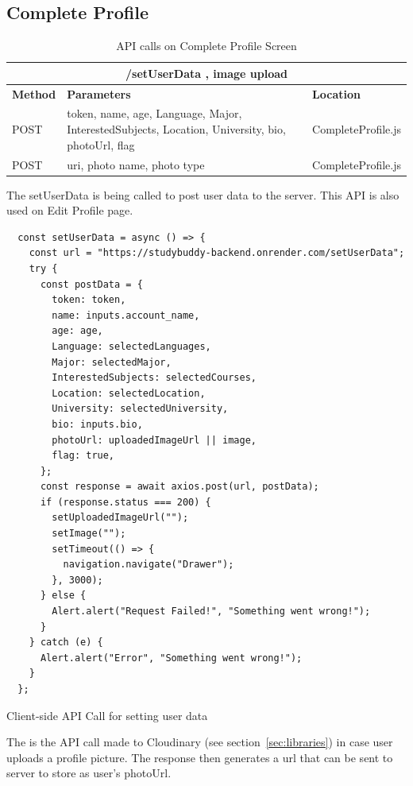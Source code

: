 \subsection{Complete Profile}\label{subsec:complete_profile}
\begin{table}[H]
	\centering
	\begin{tabular}{ |p{}|p{}|p{}| }
		\hline
            \multicolumn{3}{|c|}{/setUserData , image upload} \\
            \hline
		\textbf{Method} & \textbf{Parameters} & \textbf{Location}\\
            \hline
		  POST & token, name, age, Language, Major, InterestedSubjects, Location, University, bio, photoUrl, flag & CompleteProfile.js\\
            \hline
		  POST & uri, photo name, photo type & CompleteProfile.js\\
            \hline
	\end{tabular}
	\caption{API calls on Complete Profile Screen}
	\label{tab:complete_profile}
\end{table}
The setUserData is being called to post user data to the server. This API is also used on Edit Profile page.
\begin{listing}[H]
\begin{verbatim} 
  const setUserData = async () => {
    const url = "https://studybuddy-backend.onrender.com/setUserData";
    try {
      const postData = {
        token: token,
        name: inputs.account_name,
        age: age,
        Language: selectedLanguages,
        Major: selectedMajor,
        InterestedSubjects: selectedCourses,
        Location: selectedLocation,
        University: selectedUniversity,
        bio: inputs.bio,
        photoUrl: uploadedImageUrl || image,
        flag: true,
      };
      const response = await axios.post(url, postData);
      if (response.status === 200) {
        setUploadedImageUrl("");
        setImage("");
        setTimeout(() => {
          navigation.navigate("Drawer");
        }, 3000);
      } else {
        Alert.alert("Request Failed!", "Something went wrong!");
      }
    } catch (e) {
      Alert.alert("Error", "Something went wrong!");
    }
  };
\end{verbatim}
\caption{Client-side API Call for setting user data}
\label{src:complete_profile}
\end{listing}
The is the API call made to Cloudinary (see section~\ref{sec:libraries}) in case user uploads a profile picture. The response then generates a url that can be sent to server to store as user's photoUrl.
